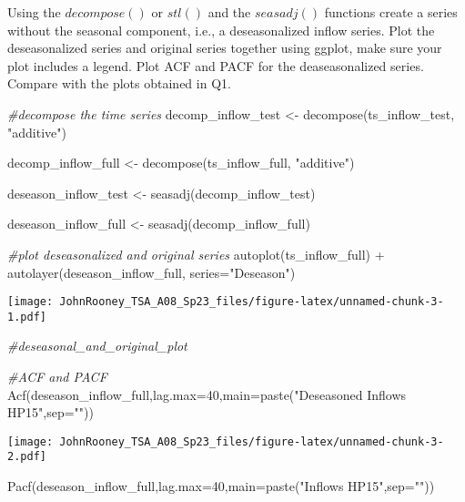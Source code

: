 \documentclass[
]{article}
\newenvironment{Shaded}{\begin{snugshade}}{\end{snugshade}}
\newcommand{\AttributeTok}[1]{\textcolor[rgb]{0.77,0.63,0.00}{#1}}
\newcommand{\CommentTok}[1]{\textcolor[rgb]{0.56,0.35,0.01}{\textit{#1}}}
\newcommand{\DecValTok}[1]{\textcolor[rgb]{0.00,0.00,0.81}{#1}}
\newcommand{\FunctionTok}[1]{\textcolor[rgb]{0.00,0.00,0.00}{#1}}
\newcommand{\NormalTok}[1]{#1}
\newcommand{\OtherTok}[1]{\textcolor[rgb]{0.56,0.35,0.01}{#1}}
\newcommand{\SpecialCharTok}[1]{\textcolor[rgb]{0.00,0.00,0.00}{#1}}
\newcommand{\StringTok}[1]{\textcolor[rgb]{0.31,0.60,0.02}{#1}}
\begin{document}
Using the \(decompose()\) or \(stl()\) and the \(seasadj()\) functions
create a series without the seasonal component, i.e., a deseasonalized
inflow series. Plot the deseasonalized series and original series
together using ggplot, make sure your plot includes a legend. Plot ACF
and PACF for the deaseasonalized series. Compare with the plots obtained
in Q1.

\begin{Shaded}
\begin{Highlighting}[]
\CommentTok{\#decompose the time series}
\NormalTok{decomp\_inflow\_test }\OtherTok{\textless{}{-}} \FunctionTok{decompose}\NormalTok{(ts\_inflow\_test, }\StringTok{"additive"}\NormalTok{)}

\NormalTok{decomp\_inflow\_full }\OtherTok{\textless{}{-}} \FunctionTok{decompose}\NormalTok{(ts\_inflow\_full, }\StringTok{"additive"}\NormalTok{)}

\NormalTok{deseason\_inflow\_test }\OtherTok{\textless{}{-}} \FunctionTok{seasadj}\NormalTok{(decomp\_inflow\_test)}

\NormalTok{deseason\_inflow\_full }\OtherTok{\textless{}{-}} \FunctionTok{seasadj}\NormalTok{(decomp\_inflow\_full)}

\CommentTok{\#plot deseasonalized and original series}
\FunctionTok{autoplot}\NormalTok{(ts\_inflow\_full) }\SpecialCharTok{+}
  \FunctionTok{autolayer}\NormalTok{(deseason\_inflow\_full, }\AttributeTok{series=}\StringTok{"Deseason"}\NormalTok{)}
\end{Highlighting}
\end{Shaded}

\texttt{[image: JohnRooney\_TSA\_A08\_Sp23\_files/figure-latex/unnamed-chunk-3-1.pdf]}

\begin{Shaded}
\begin{Highlighting}[]
\CommentTok{\#deseasonal\_and\_original\_plot}

\CommentTok{\#ACF and PACF}
\FunctionTok{Acf}\NormalTok{(deseason\_inflow\_full,}\AttributeTok{lag.max=}\DecValTok{40}\NormalTok{,}\AttributeTok{main=}\FunctionTok{paste}\NormalTok{(}\StringTok{"Deseasoned Inflows HP15"}\NormalTok{,}\AttributeTok{sep=}\StringTok{""}\NormalTok{)) }
\end{Highlighting}
\end{Shaded}

\texttt{[image: JohnRooney\_TSA\_A08\_Sp23\_files/figure-latex/unnamed-chunk-3-2.pdf]}

\begin{Shaded}
\begin{Highlighting}[]
\FunctionTok{Pacf}\NormalTok{(deseason\_inflow\_full,}\AttributeTok{lag.max=}\DecValTok{40}\NormalTok{,}\AttributeTok{main=}\FunctionTok{paste}\NormalTok{(}\StringTok{"Inflows HP15"}\NormalTok{,}\AttributeTok{sep=}\StringTok{""}\NormalTok{))}
\end{Highlighting}
\end{Shaded}
\end{document}

